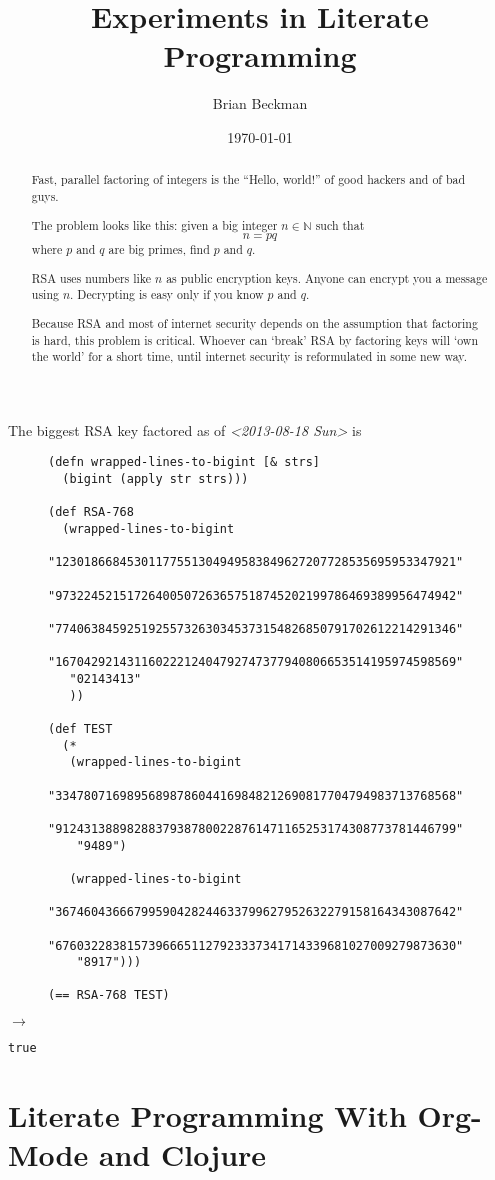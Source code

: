 \documentclass[11pt]{article}
\author{Brian Beckman}
\date{\today}
\title{Experiments in Literate Programming}
\begin{document}
\maketitle
\tableofcontents

\begin{abstract}
Fast, parallel factoring of integers is the ``Hello, world!''
of good hackers and of bad guys.

The problem looks like this: given a big integer $n\in\mathbb{N}$ such
 that \[n = p q\] where $p$ and $q$
are big primes, find $p$ and $q$.

RSA uses numbers like $n$ as public encryption
keys. Anyone can encrypt you a message using $n$.
Decrypting is easy only if you know $p$ and $q$.

Because RSA and most of 
internet security depends on the assumption that factoring is
hard, this problem is critical. Whoever can
`break' RSA by factoring keys will `own the world' for a short time,
until internet security is reformulated in some new way.
\end{abstract}


The biggest RSA key factored as of \textit{<2013-08-18 Sun>} is
\begin{figure}[H]
\label{biggest-factored-rsa-key}
\begin{verbatim}
(defn wrapped-lines-to-bigint [& strs]
  (bigint (apply str strs)))

(def RSA-768
  (wrapped-lines-to-bigint
   "12301866845301177551304949583849627207728535695953347921"
   "97322452151726400507263657518745202199786469389956474942"
   "77406384592519255732630345373154826850791702612214291346"
   "16704292143116022212404792747377940806653514195974598569"
   "02143413"
   ))

(def TEST
  (*
   (wrapped-lines-to-bigint
    "33478071698956898786044169848212690817704794983713768568"
    "91243138898288379387800228761471165253174308773781446799"
    "9489")

   (wrapped-lines-to-bigint
    "36746043666799590428244633799627952632279158164343087642"
    "67603228381573966651127923337341714339681027009279873630"
    "8917")))

(== RSA-768 TEST)
\end{verbatim}
\end{figure}
$\longrightarrow$
\begin{verbatim}
true
\end{verbatim}

\section{Literate Programming With Org-Mode and Clojure}
\label{sec-1}
\end{document}
